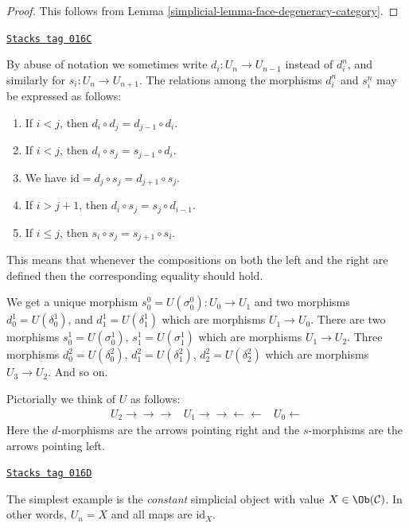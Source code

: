 \begin{proof}

This follows from Lemma \ref{simplicial-lemma-face-degeneracy-category}.
\end{proof}

\begin{remark}[Relations]
\label{simplicial-remark-relations}
\href{https://stacks.math.columbia.edu/tag/016C}{\texttt{Stacks tag 016C}}

By abuse of notation we sometimes write $d_i : U_n \to U_{n - 1}$
instead of $d^n_i$, and similarly for $s_i : U_n \to U_{n + 1}$.
The relations among the morphisms $d^n_i$ and $s^n_i$
may be expressed as follows:
\begin{enumerate}
\item If $i < j$, then $d_i \circ d_j = d_{j - 1} \circ d_i$.
\item If $i < j$, then $d_i \circ s_j = s_{j - 1} \circ d_i$.
\item We have $\text{id} = d_j \circ s_j = d_{j + 1} \circ s_j$.
\item If $i > j + 1$, then $d_i \circ s_j = s_j \circ d_{i - 1}$.
\item If $i \leq j$, then $s_i \circ s_j = s_{j + 1} \circ s_i$.
\end{enumerate}
This means that whenever the compositions on both the left and the
right are defined then the corresponding equality should hold.
\end{remark}

We get a unique morphism $s^0_0 = U(\sigma^0_0) : U_0 \to U_1$ and
two morphisms $d^1_0 = U(\delta^1_0)$, and
$d^1_1 = U(\delta^1_1)$ which are morphisms $U_1 \to U_0$.
There are two morphisms $s^1_0 = U(\sigma^1_0)$, $s^1_1 = U(\sigma^1_1)$
which are morphisms $U_1 \to U_2$. Three morphisms
$d^2_0 = U(\delta^2_0)$, $d^2_1 = U(\delta^2_1)$, $d^2_2 = U(\delta^2_2)$
which are morphisms $U_3 \to U_2$. And so on.

\medskip\noindent
Pictorially we think of $U$ as follows:
$$
\begin{array}{ccc}U_2
\longrightarrow\longrightarrow\longrightarrow & U_1
\longrightarrow\longrightarrow\longleftarrow\longleftarrow & U_0
\longleftarrow\end{array}
$$
Here the $d$-morphisms are the arrows pointing right and the
$s$-morphisms are the arrows pointing left.

\begin{example}
\label{simplicial-example-constant-simplicial-object}
\href{https://stacks.math.columbia.edu/tag/016D}{\texttt{Stacks tag 016D}}

The simplest example is the {\it constant} simplicial object with
value $X \in \Ob(\mathcal{C})$. In other words, $U_n = X$ and
all maps are $\text{id}_X$.
\end{example}


